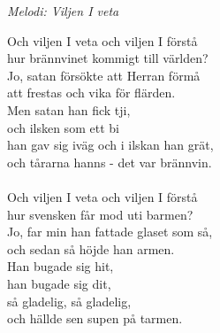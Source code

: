 {\footnotesize\textit{Melodi: Viljen I veta}}\par
\vspace{10pt}
Och viljen I veta och viljen I förstå\\
hur brännvinet kommigt till världen?\\
Jo, satan försökte att Herran förmå\\
att frestas och vika för flärden.\\
Men satan han fick tji,\\
och ilsken som ett bi\\
han gav sig iväg och i ilskan han grät,\\
och tårarna hanns - det var brännvin.\\
\\
Och viljen I veta och viljen I förstå\\
hur svensken får mod uti barmen?\\
Jo, far min han fattade glaset som så,\\
och sedan så höjde han armen.\\
Han bugade sig hit,\\
han bugade sig dit,\\
så gladelig, så gladelig,\\
och hällde sen supen på tarmen.
